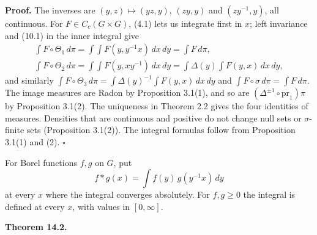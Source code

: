 \documentclass[
  english,
  11pt,
  a4paper,
]{article}
\begin{document}
\textbf{Proof.} The inverses are \((y,z)\mapsto(yz,y)\), \((zy,y)\) and
\((zy^{-1},y)\), all continuous. For \(F\in C_c(G\times G)\), (4.1) lets
us integrate first in \(x\); left invariance and (10.1) in the inner
integral give
\[\begin{gathered}
\int F\circ\Theta_1\,d\pi=\int\!\!\int F(y,y^{-1}x)\,dx\,dy=\int F\,d\pi,\qquad\\
\int F\circ\Theta_2\,d\pi=\int\!\!\int F(y,xy^{-1})\,dx\,dy=\int\Delta(y)\!\int F(y,x)\,dx\,dy,
\end{gathered}\]
and similarly
\(\int F\circ\Theta_3\,d\pi=\int\Delta(y)^{-1}\int F(y,x)\,dx\,dy\) and
\(\int F\circ\sigma\,d\pi=\int F\,d\pi\). The image measures are Radon
by Proposition 3.1(1), and so are
\((\Delta^{\pm1}\circ\mathrm{pr}_1)\pi\) by Proposition 3.1(2). The
uniqueness in Theorem 2.2 gives the four identities of measures.
Densities that are continuous and positive do not change null sets or
\(\sigma\)-finite sets (Proposition 3.1(2)). The integral formulas
follow from Proposition 3.1(1) and (2). \(\square\)

For Borel functions \(f,g\) on \(G\), put
\[f*g(x)=\int f(y)\,g(y^{-1}x)\,dy
\tag{14.1}\] at every \(x\) where the integral converges absolutely. For
\(f,g\geq0\) the integral is defined at every \(x\), with values in
\([0,\infty]\).

\textbf{Theorem 14.2.}
\end{document}
